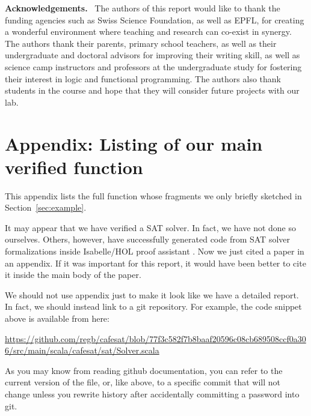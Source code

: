\documentclass[a4paper,UKenglish,cleveref, autoref, thm-restate]{lipics-v2021}
\begin{document}
\vspace{0.5cm} %
\noindent %
\textbf{\large Acknowledgements.}\ %
The authors of this report would like to thank the funding agencies such as Swiss Science Foundation, as well as EPFL,
  for creating a wonderful environment where teaching and research can co-exist in synergy.
  The authors thank their parents, primary school teachers, as well as their undergraduate and doctoral advisors
  for improving their writing skill, as well as science camp instructors and professors at the undergraduate
  study for fostering their interest in logic and functional programming. The authors also
  thank students in the course and hope that they will consider future projects with our lab.



\appendix %

\section{Appendix: Listing of our main verified function}\label{app:verifiedFunction}

This appendix lists the full function whose fragments we only briefly sketched in Section~\ref{sec:example}.


It may appear that we have verified a SAT solver. In fact, we have not done so ourselves.
Others, however, have successfully generated code from SAT solver formalizations inside Isabelle/HOL proof assistant
\cite{DBLP:conf/cade/BlanchetteFW16}. Now we just cited a paper in an appendix. If it was important for this report,
it would have been better to cite it inside the main body of the paper.

We should not use appendix just to make it look like we have a detailed report. In fact, we should instead link to a git repository.
For example, the code snippet above is available from here:
\begin{center}
  \url{https://github.com/regb/cafesat/blob/77f3c582f7b8baaf20596c08cb689508ccf0a306/src/main/scala/cafesat/sat/Solver.scala}
\end{center}
As you may know from reading github documentation, you can refer to the current version of the file, or, like above, to
a specific commit that will not change unless you rewrite history after accidentally committing a password into git.
\end{document}
